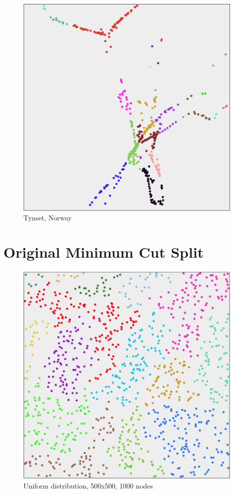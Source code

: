 \begin{appendices}
	\begin{figure}[H]
		\centering
		\includegraphics[width=11cm]{Images/computations/KMEANSTynset.jpg}
		\caption{Tynset, Norway}
	\end{figure}



	\section{Original Minimum Cut Split}
	\label{appendix:mincutsplitone}
	\begin{figure}
		\centering
		\includegraphics[width=11cm]{Images/computations/MINCUT500_500.png}
		\caption{Uniform distribution, 500x500, 1000 nodes}
	\end{figure}


\end{appendices}
